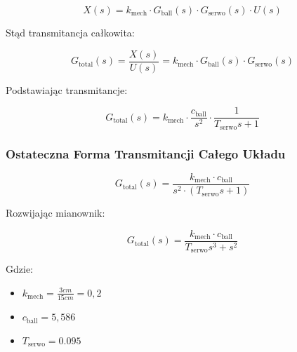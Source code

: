 \begin{equation}
X(s) = k_{\mathrm{mech}} \cdot G_{\mathrm{ball}}(s) \cdot G_{\mathrm{serwo}}(s) \cdot U(s)
\end{equation}

Stąd transmitancja całkowita:

\begin{equation}
G_{\mathrm{total}}(s) = \frac{X(s)}{U(s)} = k_{\mathrm{mech}} \cdot G_{\mathrm{ball}}(s) \cdot G_{\mathrm{serwo}}(s)
\end{equation}

Podstawiając transmitancje:

\begin{equation}
G_{\mathrm{total}}(s) = k_{\mathrm{mech}} \cdot \frac{c_{\mathrm{ball}}}{s^2} \cdot \frac{1}{T_{\mathrm{serwo}} s + 1}
\end{equation}

\subsubsection{Ostateczna Forma Transmitancji Całego Układu}

\begin{equation}
G_{\mathrm{total}}(s) =\frac{k_{\mathrm{mech}} \cdot c_{\mathrm{ball}}}{s^2 \cdot (T_{\mathrm{serwo}} s + 1)}
\end{equation}

Rozwijając mianownik:

\begin{equation}
G_{\mathrm{total}}(s) = \frac{k_{\mathrm{mech}} \cdot c_{\mathrm{ball}}}{T_{\mathrm{serwo}} s^3 + s^2}
\end{equation}

Gdzie:
\begin{itemize}
  \item $k_{\mathrm{mech}}=\frac{3cm}{15cm}=0,2$
  \item $c_{\mathrm{ball}}=5,586$
  \item $T_{\mathrm{serwo}}=0.095$
\end{itemize}








